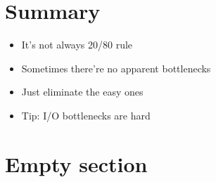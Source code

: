 \documentclass[16pt]{beamer}
\begin{document}
\section*{Summary}

\begin{frame}{}
  \begin{itemize}
  \item It's not always 20/80 rule
  \item Sometimes there're no apparent bottlenecks
  \item Just eliminate the easy ones
  \item Tip: I/O bottlenecks are hard
  \end{itemize}
\end{frame}

\section{Empty section}
\end{document}
